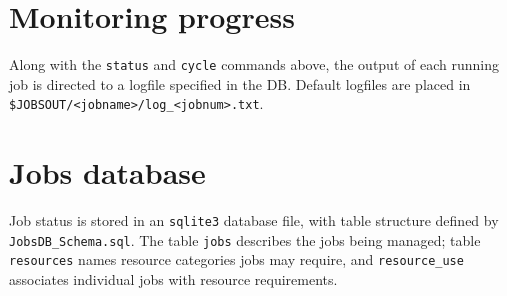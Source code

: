 \documentclass[12pt,english]{article}
\newcommand{\cd}[1]{\texorpdfstring{{\color{blue} \texttt{#1}}}{#1}}
\begin{document}
\section{Monitoring progress}

Along with the \cd{status} and \cd{cycle} commands above,
    the output of each running job is directed to a logfile specified in the DB.
Default logfiles are placed in \cd{\$JOBSOUT/<jobname>/log\_<jobnum>.txt}.

\section{Jobs database}

Job status is stored in an \cd{sqlite3} database file, with table structure defined by \cd{JobsDB\_Schema.sql}.
The table \cd{jobs} describes the jobs being managed; table \cd{resources} names resource categories jobs may require,
    and \cd{resource\_use} associates individual jobs with resource requirements.



\end{document}

